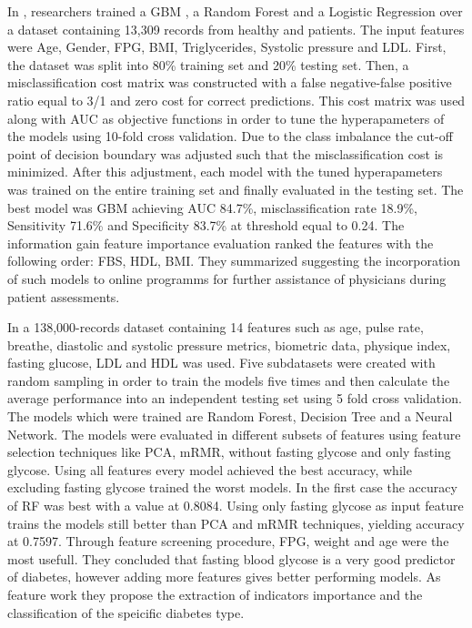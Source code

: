 \documentclass[journal,article,submit,pdftex,moreauthors]{Definitions/mdpi}
\begin{document}
\par  In \cite{Lai}, researchers trained a GBM
, a Random Forest and a Logistic Regression over a dataset containing 13,309 records
from healthy and patients. The input features were Age, Gender, FPG, BMI, Triglycerides,
Systolic pressure and LDL. First, the dataset was split into 80\% training set and
20\% testing set. Then, a misclassification cost matrix was constructed with a false
negative-false positive ratio equal to 3/1 and zero cost for correct predictions.
This cost matrix was used along with AUC as objective functions in order to tune the 
hyperapameters of the models using 10-fold cross validation. Due to the class imbalance
the cut-off point of decision boundary was adjusted such that the misclassification cost
is minimized. After this adjustment, each model with the tuned hyperapameters was 
trained on the entire training set and finally evaluated in the testing set. The
best model was GBM achieving AUC 84.7\%,
misclassification rate 18.9\%, Sensitivity 71.6\% and Specificity 83.7\% at threshold equal to 0.24. The information gain
feature importance evaluation ranked the features with the following order: FBS, HDL, BMI. They 
summarized suggesting the incorporation of such models to online programms for 
further assistance of physicians during patient assessments.

\par In \cite{Zou} a 138,000-records dataset containing 
14 features such as age, pulse rate, breathe, diastolic and systolic pressure metrics, biometric data, physique
index, fasting glucose, LDL and HDL was used. Five subdatasets were created with 
random sampling in order to train the models five times and then calculate the average 
performance into an independent testing set using 5 fold cross validation. The models
which were trained are Random Forest, Decision Tree and a Neural Network. The models
were evaluated in different subsets of features using feature selection techniques like
PCA, mRMR, without fasting glycose and only fasting glycose. Using all features every model
achieved the best accuracy, while excluding fasting glycose trained the worst models. In the 
first case the accuracy of RF  was best with a value at 0.8084. Using only fasting glycose as input feature trains the models
still better than PCA and mRMR techniques, yielding accuracy at 0.7597. Through feature screening procedure, FPG, weight and age were
the most usefull. They concluded that fasting blood glycose is a very good predictor of diabetes, however
adding more features gives better performing models. As feature work they propose 
the extraction of indicators importance and the classification of the speicific diabetes 
type.
\end{document}
